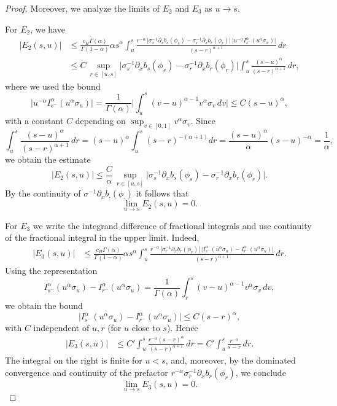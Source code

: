 \documentclass[10pt,a4paper]{amsart}
\begin{document}
\begin{proof}
Moreover, we analyze the limits of \(E_2\) and \(E_3\) as \(u\to s\).

For \(E_2\), we have
\begin{align*}
    |E_2(s,u)|
    &\le \frac{c_H\Gamma(\alpha)}{\Gamma(1-\alpha)}\alpha s^\alpha
    \int_u^s \frac{ r^{-\alpha}\, \big|\sigma_s^{-1}\partial_x b_s(\phi_s)-\sigma_r^{-1}\partial_x b_r(\phi_r)\big|
    \,\big|u^{-\alpha}I_{s^-}^\alpha(u^\alpha\sigma_u)\big|}{(s-r)^{\alpha+1}}\,dr\\
    &\le C\,\sup_{r\in[u,s]}\big|\sigma_s^{-1}\partial_x b_s(\phi_s)-\sigma_r^{-1}\partial_x b_r(\phi_r)\big|
    \int_u^s \frac{(s-u)^\alpha}{(s-r)^{\alpha+1}}\,dr,
\end{align*}
where we used the bound
\[
\big|u^{-\alpha}I_{s^-}^\alpha(u^\alpha\sigma_u)\big|
= \frac{1}{\Gamma(\alpha)}\Big|\int_u^s (v-u)^{\alpha-1} v^\alpha\sigma_v\,dv\Big|
\le C (s-u)^\alpha,
\]
with a constant \(C\) depending on \(\sup_{v\in[0,1]} v^\alpha\sigma_v\). Since
\[
\int_u^s \frac{(s-u)^\alpha}{(s-r)^{\alpha+1}}\,dr = (s-u)^\alpha\int_u^s (s-r)^{-(\alpha+1)}dr
= \frac{(s-u)^\alpha}{\alpha}(s-u)^{-\alpha}=\frac{1}{\alpha},
\]
we obtain the estimate
\[
|E_2(s,u)| \le \frac{C}{\alpha}\,\sup_{r\in[u,s]}\big|\sigma_s^{-1}\partial_x b_s(\phi_s)-\sigma_r^{-1}\partial_x b_r(\phi_r)\big|.
\]
By the continuity of \(\sigma^{-1}\partial_x b_\cdot(\phi_\cdot)\) it follows that
\[
\lim_{u\to s} E_2(s,u)=0.
\]

For \(E_3\) we write the integrand difference of fractional integrals and use continuity of the fractional integral in the upper limit. Indeed,
\begin{align*}
    |E_3(s,u)|
    &\le \frac{c_H\Gamma(\alpha)}{\Gamma(1-\alpha)}\alpha s^\alpha
    \int_u^s \frac{ r^{-\alpha}\,|\sigma_r^{-1}\partial_x b_r(\phi_r)|\,
    \big|I_{s^-}^\alpha(u^\alpha\sigma_u)- I_{r^-}^\alpha(u^\alpha\sigma_u)\big|}{(s-r)^{\alpha+1}}\,dr.
\end{align*}
Using the representation
\[
I_{s^-}^\alpha(u^\alpha\sigma_u)- I_{r^-}^\alpha(u^\alpha\sigma_u)
= \frac{1}{\Gamma(\alpha)}\int_r^s (v-u)^{\alpha-1} v^\alpha\sigma_v\,dv,
\]
we obtain the bound
\[
\big|I_{s^-}^\alpha(u^\alpha\sigma_u)- I_{r^-}^\alpha(u^\alpha\sigma_u)\big|
\le C (s-r)^\alpha,
\]
with \(C\) independent of \(u,r\) (for \(u\) close to \(s\)). Hence
\begin{align*}
    |E_3(s,u)|
    &\le C' \int_u^s \frac{ r^{-\alpha} (s-r)^\alpha}{(s-r)^{\alpha+1}}\,dr
    = C' \int_u^s \frac{r^{-\alpha}}{s-r}\,dr.
\end{align*}
The integral on the right is finite for \(u<s\), and, moreover, by the dominated convergence and continuity of the prefactor \(r^{-\alpha}\sigma_r^{-1}\partial_x b_r(\phi_r)\), we conclude
\[
\lim_{u\to s} E_3(s,u)=0.
\]


\end{proof}
\end{document}
